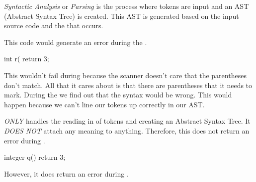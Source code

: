 \begin{definition}\label{def:Syntactic Analysis}
  \emph{Syntactic Analysis} or \emph{Parsing} is the process where tokens are input and an AST (Abstract Syntax Tree) is created.
  This AST is generated based on the input source code and the  that occurs.

  This code would generate an error during the .
  \begin{javasource}
    int r( {
      return 3;
    }
  \end{javasource}
  This wouldn't fail during  because the scanner doesn't care that the parentheses don't match.
  All that it cares about is that there are parentheses that it needs to mark.
  During the  we find out that the syntax would be wrong.
  This would happen because we can't line our tokens up correctly in our AST.
  
  \begin{remark}
     \emph{ONLY} handles the reading in of tokens and creating an Abstract Syntax Tree.
    It \emph{DOES NOT} attach any meaning to anything.
    Therefore, this does not return an error during .
    \begin{javasource}
      integer q() {
        return 3;
      }
    \end{javasource}
    However, it does return an error during .
  \end{remark}
\end{definition}

